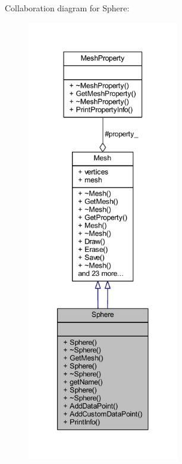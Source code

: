 Collaboration diagram for Sphere\+:
\nopagebreak
\begin{figure}[H]
\begin{center}
\leavevmode
\includegraphics[height=550pt]{class_sphere__coll__graph}
\end{center}
\end{figure}
